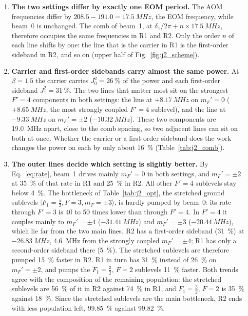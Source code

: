 \documentclass[11pt,a4paper,oneside]{report}
\begin{document}
\begin{enumerate}
  \item \textbf{The two settings differ by exactly one EOM period.} The AOM frequencies differ
        by $208.5-191.0=\SI{17.5}{MHz}$, the EOM frequency, while beam~0 is unchanged. The comb
        of beam~1, at $\delta_1/2\pi+n\times\SI{17.5}{MHz}$, therefore occupies the same
        frequencies in R1 and R2. Only the order $n$ of each line shifts by one: the line that is
        the carrier in R1 is the first-order sideband in R2, and so on (upper half of
        Fig.~\ref{fig:j2_scheme}).
  \item \textbf{Carrier and first-order sidebands carry almost the same power.} At $\beta=1.5$
        the carrier carries $J_0^2=\SI{26}{\percent}$ of the power and each first-order
        sideband $J_1^2=\SI{31}{\percent}$. The two lines that matter most sit on the strongest
        $F'=4$ components in both settings: the line at $+\SI{8.17}{MHz}$ on $m_F'=0$
        ($+\SI{8.65}{MHz}$, the most strongly coupled $F'=4$ sublevel), and the line at
        $-\SI{9.33}{MHz}$ on $m_F'=\pm2$ ($-\SI{10.32}{MHz}$). These two components are
        \SI{19.0}{MHz} apart, close to the comb spacing, so two adjacent lines can sit on both at
        once. Whether the carrier or a first-order sideband does the work changes the power on
        each by only about \SI{16}{\percent} (Table~\ref{tab:j2_comb}).
  \item \textbf{The outer lines decide which setting is slightly better.} By
        Eq.~\eqref{eq:rate}, beam~1 drives mainly $m_F'=0$ in both settings, and $m_F'=\pm2$ at
        \SI{35}{\percent} of that rate in R1 and \SI{25}{\percent} in R2. All other $F'=4$
        sublevels stay below \SI{4}{\percent}. The bottleneck of Table~\ref{tab:j2_opt}, the
        stretched ground sublevels $|F_1=\tfrac52,F=3,m_F=\pm3\rangle$, is hardly pumped by
        beam~0: its rate through $F'=3$ is 40 to 50 times lower than through $F'=4$. In $F'=4$ it
        couples mainly to $m_F'=\pm4$ ($-\SI{31.41}{MHz}$) and $m_F'=\pm3$
        ($-\SI{20.44}{MHz}$), which lie far from the two main lines. R2 has a first-order sideband
        (\SI{31}{\percent}) at $-\SI{26.83}{MHz}$, \SI{4.6}{MHz} from the strongly coupled
        $m_F'=\pm4$; R1 has only a second-order sideband there (\SI{5}{\percent}). The
        stretched sublevels are therefore pumped \SI{15}{\percent} faster in R2. R1 in turn has
        \SI{31}{\percent} instead of \SI{26}{\percent} on $m_F'=\pm2$, and pumps the
        $F_1=\tfrac32$, $F=2$ sublevels \SI{11}{\percent} faster. Both trends agree with the
        composition of the remaining population: the stretched sublevels are \SI{56}{\percent} of
        it in R2 against \SI{74}{\percent} in R1, and $F_1=\tfrac32$, $F=2$ is \SI{35}{\percent}
        against \SI{18}{\percent}. Since the stretched sublevels are the main bottleneck, R2 ends
        with less population left, \SI{99.85}{\percent} against \SI{99.82}{\percent}.
\end{enumerate}
\end{document}
